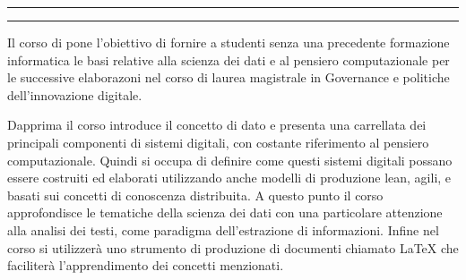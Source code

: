 \documentclass[11pt, a4paper]{article}
\begin{document}
 


  
\hrule     
\vspace{.5cm}
\begin{multicols}{1}
    \begin{description}[labelindent=0.02in,leftmargin=1.25in,style=nextline]
        \item[\textsc{Docente}:] \instructor
        \item[\textsc{Telefono}:]\phone
        \item[\textsc{E-mail}:] \email
        \item[\textsc{Ricevimento}:] \hours
        \item[\textsc{Studio}:]  {\color{darkred}\office}
        \item[\textsc{Telegram}:] \contattoTelegram
        
        \item[\textsc{Prerequisiti}:] \prerequisite
        \item[\textsc{LM}:] \csection
        \item[\textsc{Gruppo}:] \gruppoTelegram
        \item[\textsc{Impegno}:] \raggedright\ponderation
        \item[] 
    \end{description}
\end{multicols}
\hrule        
\vspace{.2cm}

\noindent
Il corso di pone l'obiettivo di fornire a studenti senza una precedente formazione informatica le basi relative alla scienza dei dati e al pensiero computazionale per le successive elaborazoni nel corso di laurea magistrale in Governance e politiche dell'innovazione digitale.

Dapprima il corso introduce il concetto di dato e presenta una carrellata dei principali componenti di sistemi digitali, con costante riferimento al pensiero computazionale. Quindi si occupa di definire come questi sistemi digitali possano essere costruiti ed elaborati utilizzando anche modelli di produzione lean, agili, e basati sui concetti di conoscenza distribuita. A questo punto il corso approfondisce le tematiche della scienza dei dati con una particolare attenzione alla analisi dei testi, come paradigma dell'estrazione di informazioni. Infine nel corso si utilizzer\`{a} uno strumento di produzione di documenti chiamato LaTeX che faciliter\`{a} l'apprendimento dei concetti menzionati.
\end{document}
